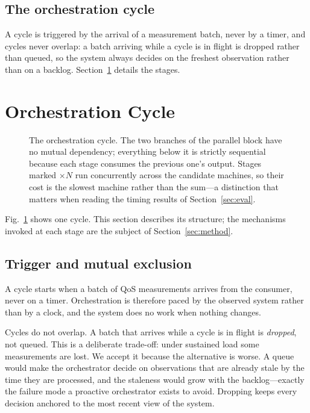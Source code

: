 \documentclass[conference]{IEEEtran}
\begin{document}
\subsection{The orchestration cycle}

A cycle is triggered by the arrival of a measurement batch, never by a timer,
and cycles never overlap: a batch arriving while a cycle is in flight is
dropped rather than queued, so the system always decides on the freshest
observation rather than on a backlog. Section~\ref{sec:design} details the
stages.

\section{Orchestration Cycle}
\label{sec:design}

\begin{figure}[!t]
\centering
\resizebox{0.86\columnwidth}{!}{}
\caption{The orchestration cycle. The two branches of the parallel block have
no mutual dependency; everything below it is strictly sequential because each
stage consumes the previous one's output. Stages marked $\times N$ run
concurrently across the candidate machines, so their cost is the slowest
machine rather than the sum---a distinction that matters when reading the
timing results of Section~\ref{sec:eval}.}
\label{fig:cycle}
\end{figure}

Fig.~\ref{fig:cycle} shows one cycle. This section describes its structure;
the mechanisms invoked at each stage are the subject of
Section~\ref{sec:method}.

\subsection{Trigger and mutual exclusion}

A cycle starts when a batch of QoS measurements arrives from the consumer,
never on a timer. Orchestration is therefore paced by the observed system
rather than by a clock, and the system does no work when nothing changes.

Cycles do not overlap. A batch that arrives while a cycle is in flight is
\emph{dropped}, not queued. This is a deliberate trade-off: under sustained
load some measurements are lost. We accept it because the alternative is
worse. A queue would make the orchestrator decide on observations that are
already stale by the time they are processed, and the staleness would grow
with the backlog---exactly the failure mode a proactive orchestrator exists to
avoid. Dropping keeps every decision anchored to the most recent view of the
system.
\end{document}
